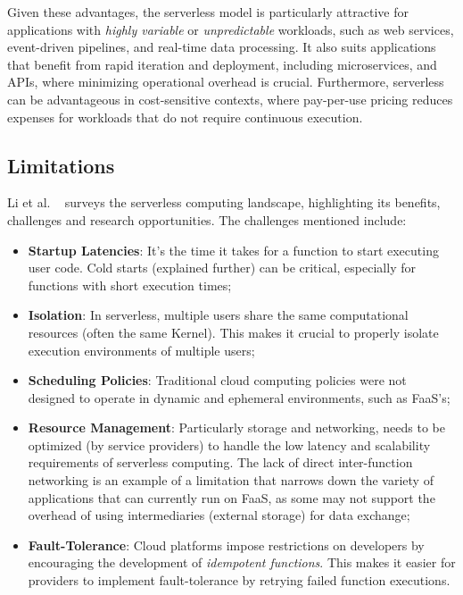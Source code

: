 Given these advantages, the serverless model is particularly attractive for applications with \textit{highly variable} or \textit{unpredictable} workloads, such as web services, event-driven pipelines, and real-time data processing. It also suits applications that benefit from rapid iteration and deployment, including microservices, and APIs, where minimizing operational overhead is crucial. Furthermore, serverless can be advantageous in cost-sensitive contexts, where pay-per-use pricing reduces expenses for workloads that do not require continuous execution.

\subsection{Limitations}
Li et al. ~\cite{serverless_computing_survey_rw1} surveys the serverless computing landscape, highlighting its benefits, challenges and research opportunities. The challenges mentioned include: 

\begin{itemize}
    \item \textbf{Startup Latencies}: It's the time it takes for a function to start executing user code. Cold starts (explained further) can be critical, especially for functions with short execution times;
    \item \textbf{Isolation}: In serverless, multiple users share the same computational resources (often the same Kernel). This makes it crucial to properly isolate execution environments of multiple users;
    \item \textbf{Scheduling Policies}: Traditional cloud computing policies were not designed to operate in dynamic and ephemeral environments, such as FaaS's;
    \item \textbf{Resource Management}: Particularly storage and networking, needs to be optimized (by service providers) to handle the low latency and scalability requirements of serverless computing. The lack of direct inter-function networking is an example of a limitation that narrows down the variety of applications that can currently run on FaaS, as some may not support the overhead of using intermediaries (external storage) for data exchange;
    \item \textbf{Fault-Tolerance}: Cloud platforms impose restrictions on developers by encouraging the development of \textit{idempotent functions}. This makes it easier for providers to implement fault-tolerance by retrying failed function executions.
\end{itemize}

